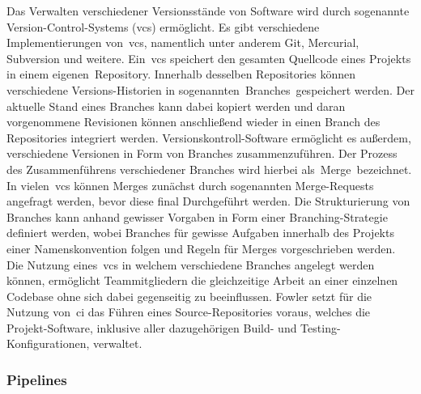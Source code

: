 Das Verwalten verschiedener Versionsstände von Software wird durch sogenannte Version-Control-Systems (\acrshort{vcs})
ermöglicht.
Es gibt verschiedene Implementierungen von\ \acrshort{vcs}, namentlich unter anderem Git, Mercurial, Subversion und
weitere.
Ein\ \acrshort{vcs} speichert den gesamten Quellcode eines Projekts in einem eigenen\ \glqq Repository\grqq.
Innerhalb desselben Repositories können verschiedene Versions-Historien in sogenannten\ \glqq Branches\grqq\ gespeichert
werden.
Der aktuelle Stand eines Branches kann dabei kopiert werden und daran vorgenommene Revisionen können anschließend wieder
in einen Branch des Repositories integriert werden.
Versionskontroll-Software ermöglicht es außerdem, verschiedene Versionen in Form von Branches zusammenzuführen.
Der Prozess des Zusammenführens verschiedener Branches wird hierbei als\ \glqq Merge\grqq\ bezeichnet.
In vielen\ \acrshort{vcs} können Merges zunächst durch sogenannten Merge-Requests angefragt werden, bevor diese
final Durchgeführt werden.
Die Strukturierung von Branches kann anhand gewisser Vorgaben in Form einer Branching-Strategie definiert werden, wobei
Branches für gewisse Aufgaben innerhalb des Projekts einer Namenskonvention folgen und Regeln für Merges
vorgeschrieben werden.
Die Nutzung eines\ \acrshort{vcs} in welchem verschiedene Branches angelegt werden können, ermöglicht Teammitgliedern
die gleichzeitige Arbeit an einer einzelnen Codebase ohne sich dabei gegenseitig zu beeinflussen.
Fowler setzt für die Nutzung von\ \acrshort{ci} das Führen eines Source-Repositories voraus, welches die
Projekt-Software, inklusive aller dazugehörigen Build- und Testing-Konfigurationen, verwaltet.

\subsubsection{Pipelines}


